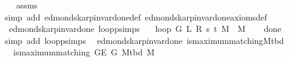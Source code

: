 \begin{isabellebody}
%
\isadelimproof
\ \ %
\endisadelimproof
%
\isatagproof
{}\isamarkupfalse%
\ assms\isanewline
\ \ \isamarkupfalse%
\ {\isacharparenleft}{\kern0pt}simp\ add{\isacharcolon}{\kern0pt}\ edmonds{\isacharunderscore}{\kern0pt}karp{\isacharunderscore}{\kern0pt}invar{\isacharunderscore}{\kern0pt}done{\isacharunderscore}{\kern0pt}{}{\isacharunderscore}{\kern0pt}def\ edmonds{\isacharunderscore}{\kern0pt}karp{\isacharunderscore}{\kern0pt}invar{\isacharunderscore}{\kern0pt}done{\isacharunderscore}{\kern0pt}{}{\isacharunderscore}{\kern0pt}axioms{\isacharunderscore}{\kern0pt}def{\isacharparenright}{\kern0pt}%
\endisatagproof
{\isafoldproof}%
%
\isadelimproof
\isanewline
%
\endisadelimproof
%
\isadeliminvisible
\isanewline
%
\endisadeliminvisible
%
\isataginvisible
{}\isamarkupfalse%
\ {\isacharparenleft}{\kern0pt}\ edmonds{\isacharunderscore}{\kern0pt}karp{\isacharunderscore}{\kern0pt}invar{\isacharunderscore}{\kern0pt}done{\isacharunderscore}{\kern0pt}{}{\isacharparenright}{\kern0pt}\ loop{\isacharprime}{\kern0pt}{\isacharunderscore}{\kern0pt}psimps{\isacharcolon}{\kern0pt}\isanewline
\ \ \ {\isachardoublequoteopen}loop{\isacharprime}{\kern0pt}\ G\ L\ R\ s\ t\ M\ {\isacharequal}{\kern0pt}\ M{\isachardoublequoteclose}%
\endisataginvisible
{\isafoldinvisible}%
%
\isadeliminvisible
\isanewline
%
\endisadeliminvisible
%
\isadelimproof
\ \ %
\endisadelimproof
%
\isatagproof
{}\isamarkupfalse%
\ done{\isacharunderscore}{\kern0pt}{}\isanewline
\ \ \isamarkupfalse%
\ {\isacharparenleft}{\kern0pt}simp\ add{\isacharcolon}{\kern0pt}\ loop{\isacharprime}{\kern0pt}{\isacharunderscore}{\kern0pt}psimps{\isacharparenright}{\kern0pt}%
\endisatagproof
{\isafoldproof}%
%
\isadelimproof
\isanewline
%
\endisadelimproof
\isanewline
{}\isamarkupfalse%
\ {\isacharparenleft}{\kern0pt}\ edmonds{\isacharunderscore}{\kern0pt}karp{\isacharunderscore}{\kern0pt}invar{\isacharunderscore}{\kern0pt}done{\isacharunderscore}{\kern0pt}{}{\isacharparenright}{\kern0pt}\ is{\isacharunderscore}{\kern0pt}maximum{\isacharunderscore}{\kern0pt}matching{\isacharunderscore}{\kern0pt}M{\isacharunderscore}{\kern0pt}tbd{\isacharcolon}{\kern0pt}\isanewline
\ \ \ {\isachardoublequoteopen}is{\isacharunderscore}{\kern0pt}maximum{\isacharunderscore}{\kern0pt}matching\ {\isacharparenleft}{\kern0pt}G{\isachardot}{\kern0pt}E\ G{\isacharparenright}{\kern0pt}\ {\isacharparenleft}{\kern0pt}M{\isacharunderscore}{\kern0pt}tbd\ M{\isacharparenright}{\kern0pt}{\isachardoublequoteclose}\isanewline

\end{isabellebody}
